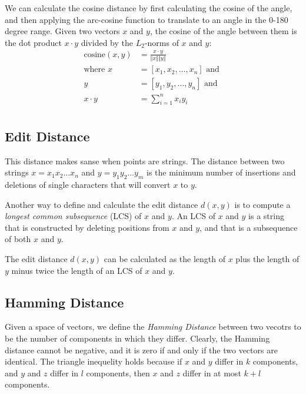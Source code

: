 We can calculate the cosine distance by first calculating the cosine of the angle, and then applying the arc-cosine function to translate to an angle in the 0-180 degree range. Given two vectors $x$ and $y$, the cosine of the angle between them is the dot product $x \cdot y$ divided by the $L_2$-norms of $x$ and $y$:
\begin{equation*}
    \begin{split}
        \text{cosine}(x, y) & = \frac{x \cdot y}{\Vert x \Vert \Vert y \Vert}\\
        \text{where } x & = [x_1, x_2, \dots, x_n] \text{ and }\\ 
                      y & = [y_1, y_2, \dots, y_n] \text{ and }\\   
                      x \cdot y & = \sum_{i=1}^{n} x_i y_i\\
    \end{split}
\end{equation*}

\subsection{Edit Distance}\label{subsec:edit-distance}

This distance makes sanse when points are strings. The distance between two strings $x = x_1 x_2 \dots x_n$ and $y = y_1 y_2 \dots y_m$ is the minimum number of insertions and deletions of single characters that will convert $x$ to $y$.

Another way to define and calculate the edit distance $d(x, y)$ is to compute a \textit{longest common subsequence} (LCS) of $x$ and $y$. An LCS of $x$ and $y$ is a string that is constructed by deleting positions from $x$ and $y$, and that is a subsequence of both $x$ and $y$. 

The edit distance $d(x,y)$ can be calculated as the length of $x$ plus the length of $y$ minus twice the length of an LCS of $x$ and $y$.

\subsection{Hamming Distance}\label{subsec:hamming-distance}

Given a space of vectors, we define the \textit{Hamming Distance} between two vecotrs to be the number of components in which they differ. Clearly, the Hamming distance cannot be negative, and it is zero if and only if the two vectors are identical. The triangle inequelity holds because if $x$ and $y$ differ in $k$ components, and $y$ and $z$ differ in $l$ components, then $x$ and $z$ differ in at most $k + l$ components.

